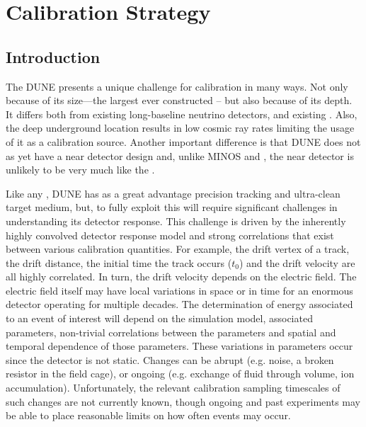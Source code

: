 \chapter{Calibration Strategy}
\label{ch:exec-summ-calib}

\section{Introduction}
\label{sec:calibintro} %


The DUNE  presents a unique challenge for calibration in many ways. Not only because of its size---the largest  ever constructed -- but also because of its depth. It differs both from existing long-baseline neutrino detectors, and existing . Also, the deep underground location results in low cosmic ray rates limiting the usage of it as a calibration source. Another important difference is that DUNE does not as yet have a near detector design and, unlike MINOS and , the near detector is unlikely to be very much like the .

Like any , DUNE has as a great advantage precision tracking and ultra-clean target medium, but, to fully exploit this will require significant challenges in understanding its detector response. This challenge is driven by the inherently highly convolved detector response model and strong correlations that exist between various calibration quantities. For example, the
drift vertex of a track, the drift distance, the initial time the track occurs ($t_0$) and the drift velocity are all highly correlated. In turn, the drift velocity depends on the electric field. The electric field itself may have local variations in space or in time for an enormous detector operating for multiple decades.
The determination of energy associated to an event of interest will depend on the simulation model, associated parameters, non-trivial correlations between the parameters and spatial and temporal dependence of those parameters. These variations in parameters occur since the detector is not static. Changes can be abrupt (e.g. noise, a broken resistor in the field cage), or ongoing (e.g. exchange of fluid through volume, ion accumulation). Unfortunately, the relevant calibration sampling timescales of such changes are not currently known, though ongoing and past experiments may be able to place reasonable limits on how often events may occur.

